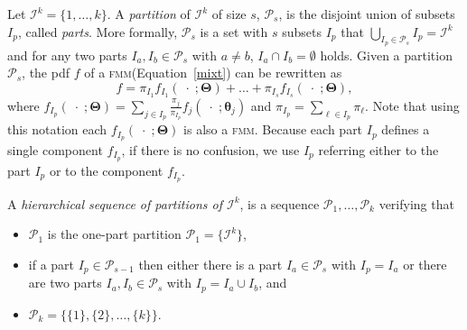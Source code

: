 \documentclass[submit]{smj}
\theoremstyle{definition}
\newcommand{\m}[1]{\boldsymbol{#1}}
\newcommand{\fmm}{\textsc{fmm}\xspace}
\begin{document}
%
Let $\mathcal{I}^k = \{1, \dots, k\}$. A \emph{partition} of $\mathcal{I}^k$ of size $s$, $\mathcal{P}_s$, is the disjoint union of subsets $I_p$, called \emph{parts}. More formally, $\mathcal{P}_s$ is a set with $s$ subsets $I_p$  that $\bigcup_{I_p \in \mathcal{P}_s} I_p = \mathcal{I}^k$ and for any two parts $I_a, I_b \in \mathcal{P}_s$ with $a \neq b$, $I_a \cap I_b = \emptyset$ holds. Given a partition  $\mathcal{P}_s$, the pdf $f$ of a \fmm (Equation~\ref{mixt}) can be rewritten as
\begin{equation}
f = \pi_{I_1} f_{I_1}(\;\cdot\;; \m\Theta) + \dots + \pi_{I_s} f_{I_s}(\;\cdot\;; \m\Theta),
\label{mixt_part}
\end{equation}
where $f_{I_p}(\;\cdot\;;  \m\Theta) = \sum_{j \in I_p} \frac{\pi_j}{\pi_{I_p}} f_j(\;\cdot\; ; \m\theta_j)$ and $\pi_{I_p} = \sum_{\ell \in I_p} \pi_\ell$. Note that using this notation each $f_{I_p}(\;\cdot\;;  \m\Theta)$ is also a \fmm. Because each part $I_p$ defines a single component $f_{I_p}$, if there is no confusion, we use $I_p$ referring either to the part $I_p$ or to the component $f_{I_p}$.



A \emph{hierarchical sequence of partitions of $\mathcal{I}^k$}, is a sequence $\mathcal{P}_1, \dots, \mathcal{P}_k$ verifying that
\begin{itemize}
\item $\mathcal{P}_1$ is the one-part partition $\mathcal{P}_1 = \{ \mathcal{I}^k \}$,
\item if a part $I_p \in \mathcal{P}_{s-1}$ then either there is a part $I_a \in \mathcal{P}_{s}$ with $I_p = I_a$ or there are two parts $I_a, I_b \in \mathcal{P}_s$ with $I_p = I_a \cup I_b$, and
\item $\mathcal{P}_k= \{ \{1\},\{2\}, \dots, \{k\} \}$.
\end{itemize}
\end{document}

